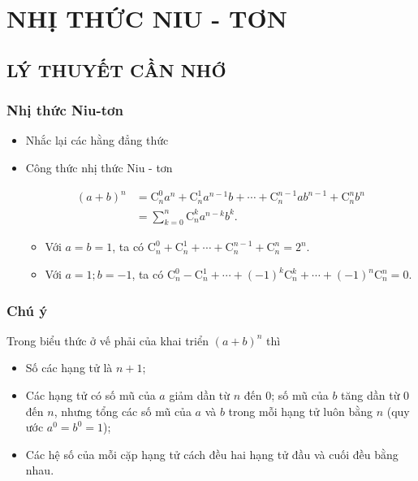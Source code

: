 \section{NHỊ THỨC NIU - TƠN}
\subsection{LÝ THUYẾT CẦN NHỚ}
\subsubsection{Nhị thức Niu-tơn}
\begin{itemize}
\item [\ding{172}] Nhắc lại các hằng đẳng thức
		\begin{boxkn}
	\end{boxkn}
\item [\ding{173}] Công thức nhị thức Niu - tơn
	\begin{boxkn}
		\begin{align*}
		\left(a+b\right)^n &=\mathrm{C}_n^0a^n+\mathrm{C}_n^1{a}^{n-1}b+\cdots+\mathrm{C}_n^{n-1}a{b}^{n-1}+\mathrm{C}_n^nb^n \\ 
		&=\displaystyle \sum\limits_{k=0}^n{\mathrm{C}_n^k{a}^{n-k}b^k.}
		\end{align*}
	\end{boxkn}
	\begin{itemize}
		\item [$\bullet$] Với $a=b=1$, ta có \quad $\mathrm{C}_n^0+\mathrm{C}_n^1+\cdots+\mathrm{C}_n^{n-1}+\mathrm{C}_n^n=2^n$.
		\item [$\bullet$] Với $a=1;  b=-1$, ta có \quad $\mathrm{C}_n^0-\mathrm{C}_n^1+\cdots+{\left(-1\right)}^k\mathrm{C}_n^k+\cdots+{\left(-1\right)}^n\mathrm{C}_n^n=0$.
	\end{itemize}
	\end{itemize}
\subsubsection{Chú ý}
Trong biểu thức ở vế phải của khai triển $\left(a+b\right)^n$ thì
	\begin{itemize}
		\item Số các hạng tử là $n+1$;
		\item Các hạng tử có số mũ của $a$ giảm dần từ $n$ đến $0$; số mũ của $b$ tăng dần từ $0$ đến $n$, nhưng tổng các số mũ của $a$ và $b$ trong mỗi hạng tử luôn bằng $n$ (quy ước $a^0=b^0=1$);
		\item Các hệ số của mỗi cặp hạng tử cách đều hai hạng tử đầu và cuối đều bằng nhau.
	\end{itemize}

